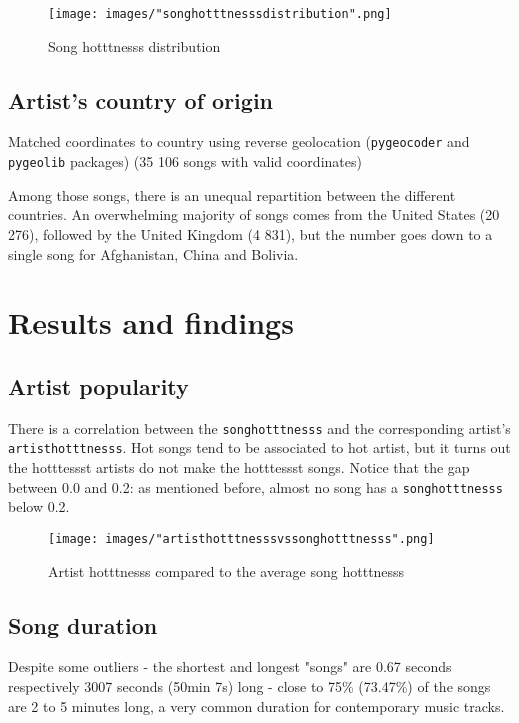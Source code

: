 \documentclass[11pt]{article}
\renewcommand\_{\textunderscore\allowbreak}
\begin{document}
\begin{figure}[h!]
\centering
\captionsetup{width=1.0\textwidth}
\texttt{[image: images/"song\_hotttnesss\_distribution".png]}
\caption{Song hotttnesss distribution}
\label{fig:song_hotttnesss_distribution}
\end{figure}

\subsection{Artist's country of origin}
Matched coordinates to country using reverse geolocation (\texttt{pygeocoder} and \texttt{pygeolib} packages) (35 106 songs with valid coordinates)

Among those songs, there is an unequal repartition between the different countries.
An overwhelming majority of songs comes from the United States (20 276), followed by the United Kingdom (4 831), but the number goes down to a single song for Afghanistan, China and Bolivia.


\section{Results and findings}


\subsection{Artist popularity}
There is a correlation between the \texttt{song\_hotttnesss} and the corresponding artist's \texttt{artist\_hotttnesss}.
Hot songs tend to be associated to hot artist, but it turns out the hotttessst artists do not make the hotttessst songs.
Notice that the gap between 0.0 and 0.2: as mentioned before, almost no song has a \texttt{song\_hotttnesss} below 0.2.

\begin{figure}[h!]
\centering
\captionsetup{width=1.0\textwidth}
\texttt{[image: images/"artist\_hotttnesss\_vs\_song\_hotttnesss".png]}
\caption{Artist hotttnesss compared to the average song hotttnesss}
\label{fig:artist_hotttnesss}
\end{figure}

\subsection{Song duration}
Despite some outliers - the shortest and longest "songs" are 0.67 seconds respectively 3007 seconds (50min 7s) long - close to 75\% (73.47\%) of the songs are 2 to 5 minutes long, a very common duration for contemporary music tracks.
\end{document}
